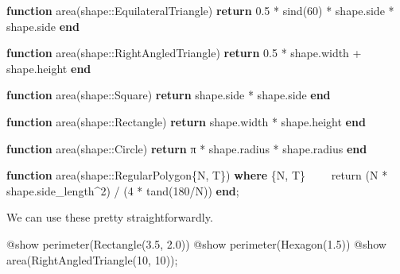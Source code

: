 \documentclass[
]{article}
\newenvironment{Shaded}{\begin{snugshade}}{\end{snugshade}}
\newcommand{\ConstantTok}[1]{\textcolor[rgb]{0.56,0.35,0.01}{#1}}
\newcommand{\ControlFlowTok}[1]{\textcolor[rgb]{0.00,0.23,0.31}{\textbf{#1}}}
\newcommand{\DataTypeTok}[1]{\textcolor[rgb]{0.68,0.00,0.00}{#1}}
\newcommand{\FloatTok}[1]{\textcolor[rgb]{0.68,0.00,0.00}{#1}}
\newcommand{\FunctionTok}[1]{\textcolor[rgb]{0.28,0.35,0.67}{#1}}
\newcommand{\KeywordTok}[1]{\textcolor[rgb]{0.00,0.23,0.31}{\textbf{#1}}}
\newcommand{\NormalTok}[1]{\textcolor[rgb]{0.00,0.23,0.31}{#1}}
\newcommand{\OperatorTok}[1]{\textcolor[rgb]{0.37,0.37,0.37}{#1}}
\newcommand{\PreprocessorTok}[1]{\textcolor[rgb]{0.68,0.00,0.00}{#1}}
\begin{document}
\begin{Shaded}
\begin{Highlighting}[]
\KeywordTok{function} \FunctionTok{area}\NormalTok{(shape}\OperatorTok{::}\DataTypeTok{EquilateralTriangle}\NormalTok{)}
   \ControlFlowTok{return} \FloatTok{0.5} \OperatorTok{*} \FunctionTok{sind}\NormalTok{(}\FloatTok{60}\NormalTok{) }\OperatorTok{*}\NormalTok{ shape.side }\OperatorTok{*}\NormalTok{ shape.side}
\KeywordTok{end}

\KeywordTok{function} \FunctionTok{area}\NormalTok{(shape}\OperatorTok{::}\DataTypeTok{RightAngledTriangle}\NormalTok{)}
   \ControlFlowTok{return} \FloatTok{0.5} \OperatorTok{*}\NormalTok{ shape.width }\OperatorTok{+}\NormalTok{ shape.height}
\KeywordTok{end}

\KeywordTok{function} \FunctionTok{area}\NormalTok{(shape}\OperatorTok{::}\DataTypeTok{Square}\NormalTok{)}
   \ControlFlowTok{return}\NormalTok{ shape.side }\OperatorTok{*}\NormalTok{ shape.side}
\KeywordTok{end}

\KeywordTok{function} \FunctionTok{area}\NormalTok{(shape}\OperatorTok{::}\DataTypeTok{Rectangle}\NormalTok{)}
   \ControlFlowTok{return}\NormalTok{ shape.width }\OperatorTok{*}\NormalTok{ shape.height}
\KeywordTok{end}

\KeywordTok{function} \FunctionTok{area}\NormalTok{(shape}\OperatorTok{::}\DataTypeTok{Circle}\NormalTok{)}
   \ControlFlowTok{return} \ConstantTok{π} \OperatorTok{*}\NormalTok{ shape.radius }\OperatorTok{*}\NormalTok{ shape.radius}
\KeywordTok{end}

\KeywordTok{function} \FunctionTok{area}\NormalTok{(shape}\OperatorTok{::}\DataTypeTok{RegularPolygon\{N, T\}}\NormalTok{) }\KeywordTok{where}\NormalTok{ \{N, T\}}
\NormalTok{    return  (N }\OperatorTok{*}\NormalTok{ shape.side\_length}\OperatorTok{\^{}}\FloatTok{2}\NormalTok{) }\OperatorTok{/}\NormalTok{ (}\FloatTok{4} \OperatorTok{*} \FunctionTok{tand}\NormalTok{(}\FloatTok{180}\OperatorTok{/}\NormalTok{N))}
\KeywordTok{end}\NormalTok{;}
\end{Highlighting}
\end{Shaded}

We can use these pretty straightforwardly.

\begin{Shaded}
\begin{Highlighting}[]
\PreprocessorTok{@show} \FunctionTok{perimeter}\NormalTok{(}\FunctionTok{Rectangle}\NormalTok{(}\FloatTok{3.5}\NormalTok{, }\FloatTok{2.0}\NormalTok{))}
\PreprocessorTok{@show} \FunctionTok{perimeter}\NormalTok{(}\FunctionTok{Hexagon}\NormalTok{(}\FloatTok{1.5}\NormalTok{))}
\PreprocessorTok{@show} \FunctionTok{area}\NormalTok{(}\FunctionTok{RightAngledTriangle}\NormalTok{(}\FloatTok{10}\NormalTok{, }\FloatTok{10}\NormalTok{));}
\end{Highlighting}
\end{Shaded}
\end{document}
